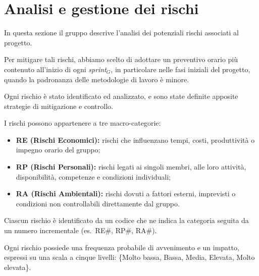 \documentclass[a4paper, 11pt]{article}
\newcommand{\term}[1]{\textit{#1}$_G$} %
\begin{document}
\section{Analisi e gestione dei rischi}
In questa sezione il gruppo descrive l'analisi dei potenziali rischi associati al progetto.

Per mitigare tali rischi, abbiamo scelto di adottare un preventivo orario più contenuto all'inizio di ogni \term{sprint}, in particolare nelle fasi iniziali del progetto, quando la padronanza delle metodologie di lavoro è minore.

Ogni rischio è stato identificato ed analizzato, e sono state definite apposite strategie di mitigazione e controllo.

I rischi possono appartenere a tre macro-categorie:
\begin{itemize}[noitemsep]
    \item \textbf{RE (Rischi Economici):} rischi che influenzano tempi, costi, produttività o impegno orario del gruppo;
    \item \textbf{RP (Rischi Personali):} rischi legati ai singoli membri, alle loro attività, disponibilità, competenze e condizioni individuali;
    \item \textbf{RA (Rischi Ambientali):} rischi dovuti a fattori esterni, imprevisti o condizioni non controllabili direttamente dal gruppo.
\end{itemize}

Ciascun rischio è identificato da un codice che ne indica la categoria seguita da un numero incrementale (es.\ RE\#, RP\#, RA\#).

Ogni rischio possiede una frequenza probabile di avvenimento e un impatto, espressi su una scala a cinque livelli: \{Molto bassa, Bassa, Media, Elevata, Molto elevata\}.

\renewcommand{\arraystretch}{1.25}
\end{document}
